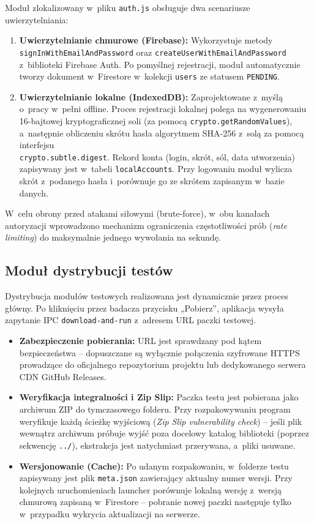\documentclass[12pt, a4paper, oneside]{report}
\begin{document}
Moduł zlokalizowany w~pliku \texttt{auth.js} obsługuje dwa scenariusze uwierzytelniania:
\begin{enumerate}
	\item \textbf{Uwierzytelnianie chmurowe (Firebase):} Wykorzystuje metody\\  \texttt{signInWithEmailAndPassword} oraz \texttt{createUserWithEmailAndPassword} z~biblioteki Firebase Auth. Po pomyślnej rejestracji, moduł automatycznie tworzy dokument w~Firestore w~kolekcji \texttt{users} ze statusem \texttt{PENDING}.
	\item \textbf{Uwierzytelnianie lokalne (IndexedDB):} Zaprojektowane z~myślą o~pracy w~pełni offline. Proces rejestracji lokalnej polega na wygenerowaniu 16-bajtowej kryptograficznej soli (za pomocą \texttt{crypto.getRandomValues}), a~następnie obliczeniu skrótu hasła algorytmem SHA-256 z~solą za pomocą interfejsu \\ \texttt{crypto.subtle.digest}. Rekord konta (login, skrót, sól, data utworzenia) zapisywany jest w~tabeli \texttt{localAccounts}. Przy logowaniu moduł wylicza skrót z~podanego hasła i~porównuje go ze skrótem zapisanym w~bazie danych.
\end{enumerate}
W~celu obrony przed atakami siłowymi (brute-force), w~obu kanałach autoryzacji wprowadzono mechanizm ograniczenia częstotliwości prób (\textit{rate limiting}) do maksymalnie jednego wywołania na sekundę.

\subsection{Moduł dystrybucji testów}
\label{subsec:impl-dystrybucja}

Dystrybucja modułów testowych realizowana jest dynamicznie przez proces główny. Po kliknięciu przez badacza przycisku „Pobierz”, aplikacja wysyła zapytanie IPC \texttt{download-and-run} z~adresem URL paczki testowej.
\begin{itemize}
	\item \textbf{Zabezpieczenie pobierania:} URL jest sprawdzany pod kątem bezpieczeństwa – dopuszczane są wyłącznie połączenia szyfrowane HTTPS prowadzące do oficjalnego repozytorium projektu lub dedykowanego serwera CDN GitHub Releases.
	\item \textbf{Weryfikacja integralności i Zip Slip:} Paczka testu jest pobierana jako archiwum ZIP do tymczasowego folderu. Przy rozpakowywaniu program weryfikuje każdą ścieżkę wyjściową (\textit{Zip Slip vulnerability check}) – jeśli plik wewnątrz archiwum próbuje wyjść poza docelowy katalog biblioteki (poprzez sekwencję \texttt{../}), ekstrakcja jest natychmiast przerywana, a~pliki usuwane.
	\item \textbf{Wersjonowanie (Cache):} Po udanym rozpakowaniu, w~folderze testu zapisywany jest plik \texttt{meta.json} zawierający aktualny numer wersji. Przy kolejnych uruchomieniach launcher porównuje lokalną wersję z~wersją chmurową zapisaną w~Firestore – pobranie nowej paczki następuje tylko w~przypadku wykrycia aktualizacji na serwerze.
\end{itemize}
\end{document}
